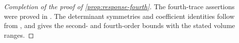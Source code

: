 \begin{proof}[Completion of the proof of \cref{prop:response-fourth}]
The fourth-trace assertions were proved in
.
The determinant symmetries and coefficient identities follow from
, and
 gives the second- and
fourth-order bounds with the stated volume ranges.
\end{proof}

\printbibliography

